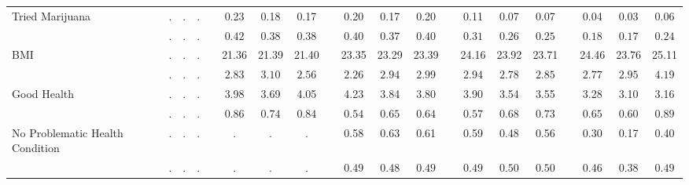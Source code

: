 \begin{center}
{\begin{longtable}{L{5cm} c c c p{.5cm} c c c p{.5cm} c c c p{.5cm} c c c p{.5cm} c c c}
 \quad Tried Marijuana & . &         . &         . & &      0.23 &      0.18 &      0.17 & &      0.20 &      0.17 &      0.20 & &      0.11 &      0.07 &      0.07 & &      0.04 &      0.03 &      0.06 \\*
 \quad & $\mathit{        .}$ & $\mathit{        .}$ & $\mathit{        .}$ & & $\mathit{     0.42}$ & $\mathit{     0.38}$ & $\mathit{     0.38}$ & & $\mathit{     0.40}$ & $\mathit{     0.37}$ & $\mathit{     0.40}$ & & $\mathit{     0.31}$ & $\mathit{     0.26}$ & $\mathit{     0.25}$ & & $\mathit{     0.18}$ & $\mathit{     0.17}$ & $\mathit{     0.24}$ \\[.2em]
 \quad BMI & . &         . &         . & &     21.36 &     21.39 &     21.40 & &     23.35 &     23.29 &     23.39 & &     24.16 &     23.92 &     23.71 & &     24.46 &     23.76 &     25.11 \\*
 \quad & $\mathit{        .}$ & $\mathit{        .}$ & $\mathit{        .}$ & & $\mathit{     2.83}$ & $\mathit{     3.10}$ & $\mathit{     2.56}$ & & $\mathit{     2.26}$ & $\mathit{     2.94}$ & $\mathit{     2.99}$ & & $\mathit{     2.94}$ & $\mathit{     2.78}$ & $\mathit{     2.85}$ & & $\mathit{     2.77}$ & $\mathit{     2.95}$ & $\mathit{     4.19}$ \\[.2em]
 \quad Good Health & . &         . &         . & &      3.98 &      3.69 &      4.05 & &      4.23 &      3.84 &      3.80 & &      3.90 &      3.54 &      3.55 & &      3.28 &      3.10 &      3.16 \\*
 \quad & $\mathit{        .}$ & $\mathit{        .}$ & $\mathit{        .}$ & & $\mathit{     0.86}$ & $\mathit{     0.74}$ & $\mathit{     0.84}$ & & $\mathit{     0.54}$ & $\mathit{     0.65}$ & $\mathit{     0.64}$ & & $\mathit{     0.57}$ & $\mathit{     0.68}$ & $\mathit{     0.73}$ & & $\mathit{     0.65}$ & $\mathit{     0.60}$ & $\mathit{     0.89}$ \\[.2em]
 \quad No Problematic Health Condition & . &         . &         . & &         . &         . &         . & &      0.58 &      0.63 &      0.61 & &      0.59 &      0.48 &      0.56 & &      0.30 &      0.17 &      0.40 \\*
 \quad & $\mathit{        .}$ & $\mathit{        .}$ & $\mathit{        .}$ & & $\mathit{        .}$ & $\mathit{        .}$ & $\mathit{        .}$ & & $\mathit{     0.49}$ & $\mathit{     0.48}$ & $\mathit{     0.49}$ & & $\mathit{     0.49}$ & $\mathit{     0.50}$ & $\mathit{     0.50}$ & & $\mathit{     0.46}$ & $\mathit{     0.38}$ & $\mathit{     0.49}$ \\[.2em]

\end{longtable}}
\end{center}
